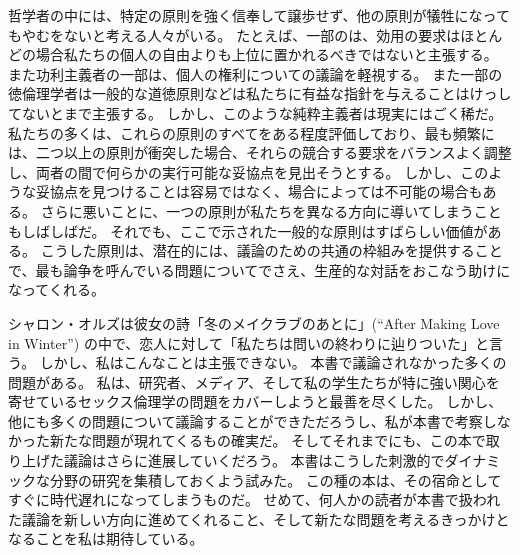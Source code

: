 \documentclass[paper=a4,book,openany]{jlreq} \usepackage{mystyle}
\begin{document}
\vspace{1\zw}

哲学者の中には、特定の原則を強く信奉して譲歩せず、他の原則が犠牲になってもやむをないと考える人々がいる。
たとえば、一部のは、効用の要求はほとんどの場合私たちの個人の自由よりも上位に置かれるべきではないと主張する。
また功利主義者の一部は、個人の権利についての議論を軽視する。
また一部の徳倫理学者は一般的な道徳原則などは私たちに有益な指針を与えることはけっしてないとまで主張する。
しかし、このような純粋主義者は現実にはごく稀だ。
私たちの多くは、これらの原則のすべてをある程度評価しており、最も頻繁には、二つ以上の原則が衝突した場合、それらの競合する要求をバランスよく調整し、両者の間で何らかの実行可能な妥協点を見出そうとする。
しかし、このような妥協点を見つけることは容易ではなく、場合によっては不可能の場合もある。
さらに悪いことに、一つの原則が私たちを異なる方向に導いてしまうこともしばしばだ。
それでも、ここで示された一般的な原則はすばらしい価値がある。
こうした原則は、潜在的には、議論のための共通の枠組みを提供することで、最も論争を呼んでいる問題についてでさえ、生産的な対話をおこなう助けになってくれる。

\vspace{1\zw}

シャロン・オルズは彼女の詩「冬のメイクラブのあとに」(``After Making Love in Winter'') の中で、恋人に対して「私たちは問いの終わりに辿りついた」と言う。
しかし、私はこんなことは主張できない。
本書で議論されなかった多くの問題がある。
私は、研究者、メディア、そして私の学生たちが特に強い関心を寄せているセックス倫理学の問題をカバーしようと最善を尽くした。
しかし、他にも多くの問題について議論することができただろうし、私が本書で考察しなかった新たな問題が現れてくるもの確実だ。
そしてそれまでにも、この本で取り上げた議論はさらに進展していくだろう。
本書はこうした刺激的でダイナミックな分野の研究を集積しておくよう試みた。
この種の本は、その宿命としてすぐに時代遅れになってしまうものだ。
せめて、何人かの読者が本書で扱われた議論を新しい方向に進めてくれること、そして新たな問題を考えるきっかけとなることを私は期待している。

\end{document}
